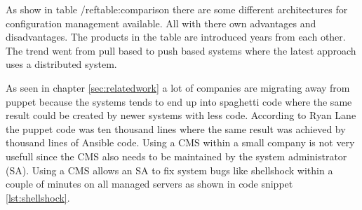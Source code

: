 As show in table /ref{table:comparison} there are some different architectures for configuration management available. All with there own advantages and disadvantages. The products in the table are introduced years from each other. The trend went from pull based to push based systems where the latest approach uses a distributed system.

As seen in chapter \ref{sec:relatedwork} a lot of companies are migrating away from puppet because the systems tends to end up into spaghetti code \cite{movingawayfrompuppet} where the same result could be created by newer systems with less code. According to Ryan Lane \cite{movingawayfrompuppet} the puppet code was ten thousand lines where the same result was achieved by thousand lines of Ansible code. Using a CMS within a small company is not very usefull since the CMS also needs to be maintained by the system administrator (SA). Using a CMS allows an SA to fix system bugs like shellshock within a couple of minutes on all managed servers as shown in code snippet \ref{lst:shellshock}.

